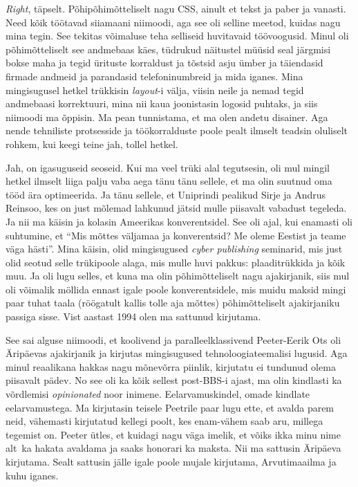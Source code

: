 \emph{Right}, täpselt. Põhipõhimõtteliselt nagu CSS, ainult et tekst ja paber 
ja vanasti. Need kõik töötavad siiamaani niimoodi, aga see oli selline meetod, 
kuidas nagu mina tegin. See  tekitas võimaluse teha selliseid huvitavaid 
töövoogusid.  Minul oli põhimõtteliselt  see andmebaas käes, tüdrukud näitustel 
müüsid seal järgmisi bokse maha ja tegid ürituste korraldust ja tõstsid asju 
ümber ja täiendasid firmade andmeid  ja parandasid telefoninumbreid ja mida 
iganes. Mina mingisugusel hetkel trükkisin \emph{layout}-i välja, viisin neile 
ja nemad tegid andmebaasi korrektuuri, mina nii kaua joonistasin logosid 
puhtaks, ja siis niimoodi ma õppisin. Ma pean tunnistama, et ma olen andetu 
disainer. Aga nende tehniliste protsesside ja töökorralduste poole pealt 
ilmselt teadsin oluliselt rohkem, kui keegi teine jah, tollel hetkel. 


Jah, on igasuguseid seoseid. Kui ma veel trüki alal tegutsesin, oli mul mingil 
hetkel ilmselt liiga palju vaba aega tänu tänu sellele, et ma olin suutnud oma 
tööd ära optimeerida. Ja tänu sellele, et Uniprindi pealikud Sirje ja Andrus 
Reinsoo, kes on just 
mõlemad lahkunud jätsid 
mulle piisavalt vabadust tegeleda. Ja nii ma käisin ja kolasin Ameerikas 
konverentsidel. See oli ajal, kui enamasti oli suhtumine, et \enquote{Mis 
mõttes väljamaa ja konverentsid? Me oleme Eestist ja teame väga hästi}. Mina 
käisin, olid mingisugused \emph{cyber publishing} seminarid, mis just olid 
seotud selle trükipoole alaga, mis mulle huvi pakkus: plaaditrükkida ja kõik 
muu. Ja oli lugu selles, et kuna ma olin põhimõtteliselt nagu ajakirjanik, siis 
mul oli võimalik möllida ennast igale poole konverentsidele, mis muidu maksid 
mingi paar tuhat taala (röögatult kallis tolle aja mõttes) põhimõtteliselt 
ajakirjaniku passiga sisse. 
Vist aastast 1994 olen ma sattunud  kirjutama.

See sai alguse niimoodi, et koolivend ja paralleelklassivend Peeter-Eerik 
Ots oli Äripäevas ajakirjanik ja kirjutas 
mingisugused tehnoloogiateemalisi lugusid. Aga minul reaalikana hakkas nagu 
mõnevõrra piinlik, kirjutatu ei tundunud olema piisavalt pädev. No see oli ka 
kõik sellest post-BBS-i ajast, ma olin kindlasti ka võrdlemisi 
\emph{opinionated} noor inimene. Eelarvamuskindel,  omade kindlate 
eelarvamustega. Ma kirjutasin teisele Peetrile paar lugu ette, et avalda parem 
neid, vähemasti  kirjutatud kellegi poolt, kes enam-vähem saab aru,  millega 
tegemist on. Peeter ütles, et kuidagi nagu väga imelik, et võiks ikka minu nime 
alt ka hakata avaldama ja saaks honorari ka maksta. Nii ma sattusin Äripäeva 
kirjutama. Sealt sattusin jälle igale poole mujale kirjutama, 
Arvutimaailma ja kuhu iganes. 

